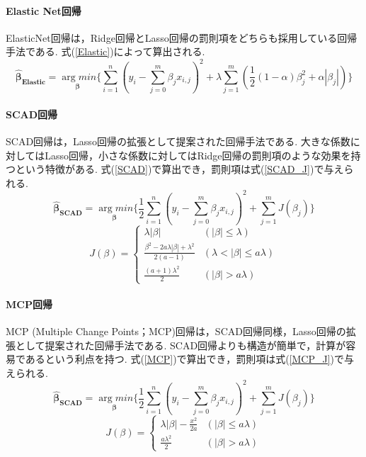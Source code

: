 \paragraph{Elastic Net回帰 \quad \\}
ElasticNet回帰\cite{Zou2005}は，Ridge回帰とLasso回帰の罰則項をどちらも採用している回帰手法である.
式(\ref{Elastic})によって算出される.
\begin{equation}
  \label{Elastic}
  \bm{\hat{\beta}_{Elastic}} =
\underset{\bm{\beta}}{\arg min}\lbrace\sum_{i=1}^{n}(y_{i} -\sum_{j=0}^{m}\beta_{j}x_{i,j})^2 +\lambda\sum_{j=1}^{m}(\frac{1}{2}(1-\alpha)\beta_{j}^2+\alpha|\beta_{j}|)\rbrace
\end{equation}
\paragraph{SCAD回帰 \quad \\}
SCAD回帰\cite{Fan2001}は，Lasso回帰の拡張として提案された回帰手法である.
大きな係数に対してはLasso回帰，小さな係数に対してはRidge回帰の罰則項のような効果を持つという特徴がある.
式(\ref{SCAD})で算出でき，罰則項は式(\ref{SCAD_J})で与えられる.
\begin{equation}
  \label{SCAD}
  \bm{\hat{\beta}_{SCAD}} =\underset{\bm{\beta}}{\arg min}\lbrace\frac{1}{2}\sum_{i=1}^{n}(y_{i} -\sum_{j=0}^{m}\beta_{j}x_{i,j})^2 +\sum_{j=1}^{m}J(\beta_{j})\rbrace
\end{equation}
\begin{equation}
  \label{SCAD_J}
  J(\beta)=
  \begin{cases}
    \lambda|\beta| &(|\beta|\le\lambda) \\
    \frac{\beta^2-2a\lambda|\beta|+\lambda^2}{2(a-1)} &(\lambda<|\beta|\le a\lambda) \\
    \frac{(a+1)\lambda^2}{2} &(|\beta|>a\lambda)
  \end{cases}
\end{equation}
\paragraph{MCP回帰 \quad \\}
MCP (Multiple Change Points；MCP)回帰\cite{Zhang2010}は，SCAD回帰同様，Lasso回帰の拡張として提案された回帰手法である.
SCAD回帰よりも構造が簡単で，計算が容易であるという利点を持つ.
式(\ref{MCP})で算出でき，罰則項は式(\ref{MCP_J})で与えられる.
\begin{equation}
  \label{MCP}
  \bm{\hat{\beta}_{SCAD}} =\underset{\bm{\beta}}{\arg min}\lbrace\frac{1}{2}\sum_{i=1}^{n}(y_{i} -\sum_{j=0}^{m}\beta_{j}x_{i,j})^2 +\sum_{j=1}^{m}J(\beta_{j})\rbrace
\end{equation}
\begin{equation}
  \label{MCP_J}
  J(\beta)=
  \begin{cases}
    \lambda|\beta|-\frac{x^2}{2a} &(|\beta|\le a\lambda) \\
    \frac{a\lambda^2}{2} &(|\beta|>a\lambda)
  \end{cases}
\end{equation}

